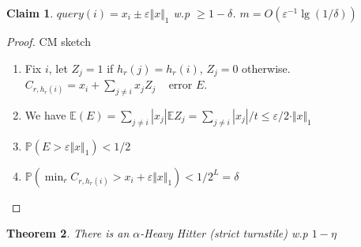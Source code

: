 \documentclass[11pt]{article}
\newtheorem{theorem}{Theorem}
\newtheorem{claim}[theorem]{Claim}
\begin{document}
\begin{claim} 
$query(i)=x_i\pm\varepsilon\Vert x\Vert_1$ w.p $\geq 1-\delta$. $m=O(\varepsilon^{-1}\lg(1/\delta))$
\end{claim}
\begin{proof} CM sketch
\begin{enumerate} 
\item Fix $i$, let $Z_j = 1$ if $h_r(j)=h_r(i)$, $Z_j=0$ otherwise. $C_{r, h_r(i)}=x_i + \sum_{j\neq i} x_jZ_j$ ~ error $E$. 
\item We have $\mathbb{E}(E)=\sum_{j\neq i}|x_j|\mathbb{E}Z_j=\sum_{j\neq i}|x_j|/t\leq\varepsilon/2\cdot\Vert x\Vert_1$
\item $\mathbb{P}(E>\varepsilon\Vert x\Vert_1)< 1/2$
\item $\mathbb{P}(\min_r C_{r, h_r(i)}> x_i + \varepsilon\Vert x\Vert_1)<1/2^L=\delta$
\end{enumerate}
\end{proof}
\begin{theorem}
There is an $\alpha$-Heavy Hitter (strict turnstile) w.p $1-\eta$
\end{theorem}
\end{document}
